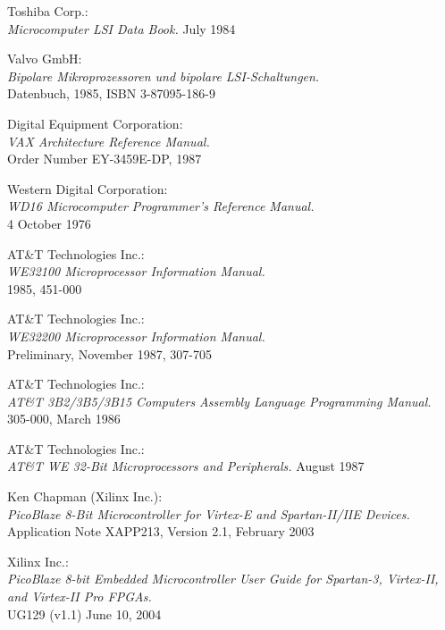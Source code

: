  Toshiba Corp.: \\
                   {\em Microcomputer LSI Data Book.}
                   July 1984

 Valvo GmbH: \\
                {\em Bipolare Mikroprozessoren und bipolare
                LSI-Schaltungen.\/} \\
                Datenbuch, 1985, ISBN 3-87095-186-9

 Digital Equipment Corporation: \\
            {\em VAX Architecture Reference Manual.\/} \\
            Order Number EY-3459E-DP, 1987

 Western Digital Corporation: \\
            {\em WD16 Microcomputer Programmer's Reference Manual.\/} \\
            4 October 1976

 AT\&T Technologies Inc.: \\
            {\em WE32100 Microprocessor Information Manual.\/} \\
            1985, 451-000

 AT\&T Technologies Inc.: \\
            {\em WE32200 Microprocessor Information Manual.\/} \\
            Preliminary, November 1987, 307-705

 AT\&T Technologies Inc.: \\
            {\em AT\&T 3B2/3B5/3B15 Computers Assembly Language Programming Manual.\/} \\
            305-000, March 1986

 AT\&T Technologies Inc.: \\
            {\em AT\&T WE 32-Bit Microprocessors and Peripherals.\/}
            August 1987

 Ken Chapman (Xilinx Inc.):\\
                 {\em PicoBlaze 8-Bit Microcontroller for Virtex-E
                 and Spartan-II/IIE Devices.\/} \\
                 Application Note XAPP213, Version 2.1, February 2003

 Xilinx Inc.: \\
                 {\em PicoBlaze 8-bit Embedded Microcontroller User Guide
                 for Spartan-3, Virtex-II, and Virtex-II Pro FPGAs.\/} \\
                 UG129 (v1.1) June 10, 2004
                          
